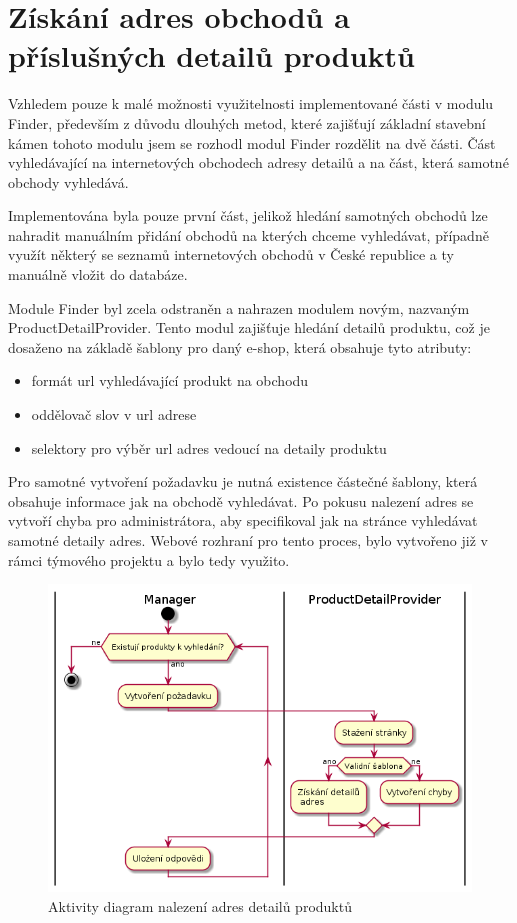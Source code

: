 \documentclass[thesis=B,czech]{FITthesis}[2012/06/26]
\begin{document}
\section{Získání adres obchodů a příslušných detailů produktů}
Vzhledem pouze k malé možnosti využitelnosti implementované části v modulu Finder, především z důvodu dlouhých metod, které zajišťují
základní stavební kámen tohoto modulu jsem se rozhodl modul Finder rozdělit na dvě části. Část vyhledávající 
na internetových obchodech adresy detailů a na část, která samotné obchody vyhledává.
\par
Implementována byla pouze první část, jelikož hledání samotných obchodů lze nahradit manuálním přidání obchodů na kterých chceme vyhledávat, případně 
využít některý se seznamů internetových obchodů v České republice a ty manuálně vložit do databáze.
\par
Module Finder byl zcela odstraněn a nahrazen modulem novým, nazvaným ProductDetailProvider.
Tento modul zajišťuje hledání detailů produktu, což je dosaženo na základě šablony pro daný e-shop, která obsahuje 
tyto atributy:
\begin{itemize}
\item formát url vyhledávající produkt na obchodu
\item oddělovač slov v url adrese
\item selektory pro výběr url adres vedoucí na detaily produktu
\end{itemize}
Pro samotné vytvoření požadavku je nutná existence částečné šablony, která obsahuje informace jak na obchodě vyhledávat.
Po pokusu nalezení adres se vytvoří chyba pro administrátora, aby specifikoval jak na stránce vyhledávat samotné detaily adres. Webové rozhraní
pro tento proces, bylo vytvořeno již v rámci týmového projektu a bylo tedy využito.

\begin{figure}[h]\centering
 	\includegraphics[width=1.0\textwidth]{resources/pdp-activity}
	\caption[Aktivity diagram nalezení adres detailů produktů]{
	Aktivity diagram nalezení adres detailů produktů}\label{fig:pdp-diagram}
\end{figure}
\end{document}
